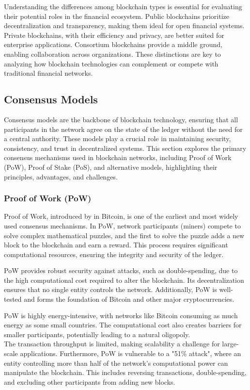 Understanding the differences among blockchain types is essential for evaluating their potential roles in the financial ecosystem. Public blockchains prioritize decentralization and transparency, making them ideal for open financial systems. Private blockchains, with their efficiency and privacy, are better suited for enterprise applications. Consortium blockchains provide a middle ground, enabling collaboration across organizations. These distinctions are key to analyzing how blockchain technologies can complement or compete with traditional financial networks.

\subsection{Consensus Models}

Consensus models are the backbone of blockchain technology, ensuring that all participants in the network agree on the state of the ledger without the need for a central authority. These models play a crucial role in maintaining security, consistency, and trust in decentralized systems. This section explores the primary consensus mechanisms used in blockchain networks, including Proof of Work (PoW), Proof of Stake (PoS), and alternative models, highlighting their principles, advantages, and challenges.

\subsubsection{Proof of Work (PoW)}

Proof of Work, introduced by  in Bitcoin, is one of the earliest and most widely used consensus mechanisms. In PoW, network participants (miners) compete to solve complex mathematical puzzles, and the first to solve the puzzle adds a new block to the blockchain and earn a reward. This process requires significant computational resources, ensuring the integrity and security of the ledger.

PoW provides robust security against attacks, such as double-spending, due to the high computational cost required to alter the blockchain. Its decentralization ensures that no single entity controls the network. Additionally, PoW is well-tested and forms the foundation of Bitcoin and other major cryptocurrencies.

PoW is highly energy-intensive, with networks like Bitcoin consuming as much energy as some small countries. The computational cost also creates barriers for smaller participants, potentially leading to a natural oligopoly. \cite{arnosti_bitcoin_2022} \\
The transaction throughput is limited, making scalability a challenge for large-scale applications. Furthermore, PoW is vulnerable to a "51\% attack", where an entity controlling more than half of the network’s computational power can manipulate the blockchain. This includes reversing transactions, double-spending, and excluding other participants from adding new blocks.  


